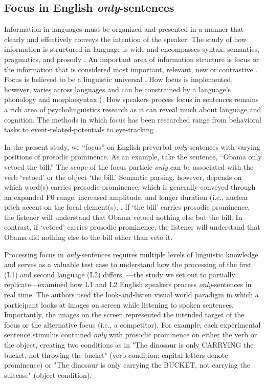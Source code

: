 \subsection{Focus in English \textit{only}-sentences}

Information in languages must be organized and presented in a manner that clearly and effectively conveys the intention of the speaker. The study of how information is structured in language is wide and encompasses syntax, semantics, pragmatics, and prosody \citep[see ][] {Breen2010, Lambrecht1994, Roberts2012}. An important area of information structure is focus or the information that is considered most important, relevant, new or contrastive \citep{Kiss1998}. Focus is believed to be a linguistic universal \citep{Comrie1989}. How focus is implemented, however, varies across languages and can be constrained by a language’s phonology and morphosyntax (\citep{Kiss1998, Lambrecht1994}. How speakers process focus in sentences remains a rich area of psycholinguistics research as it can reveal much about language and cognition. The methods in which focus has been researched range from behavioral tasks \citep[e.g.,][] {Cutler1979, Paterson1999} to event-related-potentials \citep[e.g.,][] {Chen2014, Wang2011} to eye-tracking \citep[e.g.,][] {Filik2005, Hohle2016}.

In the present study, we “focus” on English preverbal \textit{only}-sentences with varying positions of prosodic prominence. As an example, take the sentence, “Obama only vetoed the bill.” The scope of the focus particle \textit{only} can be associated with the verb ‘vetoed’ or the object ‘the bill.’ Semantic parsing, however, depends on which word(s) carries prosodic prominence, which is generally conveyed through an expanded F0 range, increased amplitude, and longer duration (i.e., nuclear pitch accent on the focal element(s); \citep{Breen2010, Gussenhoven1983}.  If ‘the bill’ carries prosodic prominence, the listener will understand that Obama vetoed nothing else but the bill. In contrast, if ‘vetoed’ carries prosodic prominence, the listener will understand that Obama did nothing else to the bill other than veto it. 

Processing focus in \textit{only}-sentences requires multiple levels of linguistic knowledge and serves as a valuable test case to understand how the processing of the first (L1) and second language (L2) differs. \cite{Ge2021}---the study we set out to partially replicate---examined how L1 and L2 English speakers process \textit{only}-sentences in real time. The authors used the look-and-listen visual world paradigm in which a participant looks at images on screen while listening to spoken sentences. Importantly, the images on the screen represented the intended target of the focus or the alternative focus (i.e., a competitor). For example, each experimental sentence stimulus contained \textit{only} with prosodic prominence on either the verb or the object, creating two conditions as in "The dinosaur is only CARRYING the bucket, not throwing the bucket" (verb condition; capital letters denote prominence) or "The dinosaur is only carrying the BUCKET, not carrying the suitcase" (object condition).

